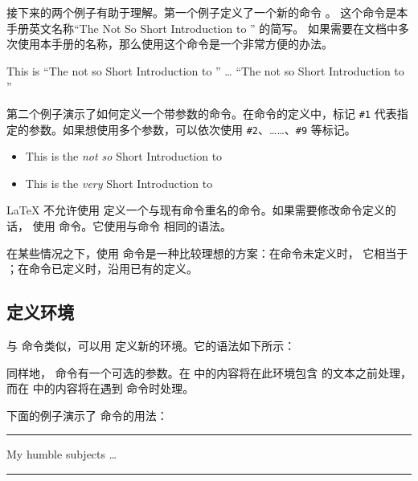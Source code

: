 接下来的两个例子有助于理解。第一个例子定义了一个新的命令 。
这个命令是本手册英文名称“The Not So Short Introduction to \LaTeXe” 的简写。
如果需要在文档中多次使用本手册的名称，那么使用这个命令是一个非常方便的办法。

\begin{example}
\newcommand{\tnss}{The not so Short
  Introduction to \LaTeXe}
This is ``\tnss'' \ldots{} ``\tnss''
\end{example}

第二个例子演示了如何定义一个带参数的命令。在命令的定义中，标记 \verb|#1|
代表指定的参数。如果想使用多个参数，可以依次使用 \verb|#2|、……、\verb|#9| 等标记。

\begin{example}
\newcommand{\txsit}[1]{This is the
  \emph{#1} Short Introduction
  to \LaTeXe}
\begin{itemize}
\item \txsit{not so}
\item \txsit{very}
\end{itemize}
\end{example}

\LaTeX{} 不允许使用  定义一个与现有命令重名的命令。如果需要修改命令定义的话，
使用  命令。它使用与命令  相同的语法。

在某些情况之下，使用  命令是一种比较理想的方案：在命令未定义时，
它相当于 ；在命令已定义时，沿用已有的定义。

\subsection{定义环境}\label{subsec:newenv}

与  命令类似，可以用  定义新的环境。它的语法如下所示：

\begin{command}
\end{command}

同样地， 命令有一个可选的参数。在  中的内容将在此环境包含
的文本之前处理，而在  中的内容将在遇到  命令时处理。

下面的例子演示了  命令的用法：
\begin{example}
\newenvironment{king}
{\rule{1ex}{1ex}%
     \hspace{\stretch{1}}}
{%
     \rule{1ex}{1ex}}

\begin{king}
My humble subjects \ldots
\end{king}
\end{example}

